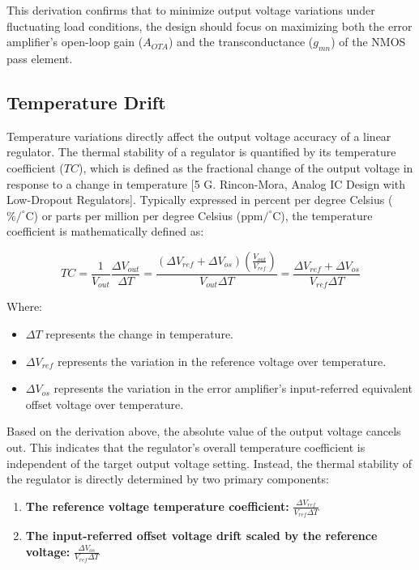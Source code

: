 \documentclass[
]{article}
\begin{document}
This derivation confirms that to minimize output voltage variations
under fluctuating load conditions, the design should focus on maximizing
both the error amplifier's open-loop gain (\(A_{OTA}\)) and the
transconductance (\(g_{mn}\)) of the NMOS pass element.

\subsection{Temperature Drift}\label{_temperature_drift}

Temperature variations directly affect the output voltage accuracy of a
linear regulator. The thermal stability of a regulator is quantified by
its temperature coefficient (\(TC\)), which is defined as the fractional
change of the output voltage in response to a change in temperature {[}5
G. Rincon-Mora, Analog IC Design with Low-Dropout Regulators{]}.
Typically expressed in percent per degree Celsius
(\(\%/^\circ\text{C}\)) or parts per million per degree Celsius
(\(\text{ppm}/^\circ\text{C}\)), the temperature coefficient is
mathematically defined as:

\[TC = \frac{1}{V_{out}} \frac{\Delta V_{out}}{\Delta T} = \frac{(\Delta V_{ref} + \Delta V_{os}) \left(\frac{V_{out}}{V_{ref}}\right)}{V_{out}\Delta T} = \frac{\Delta V_{ref} + \Delta V_{os}}{V_{ref}\Delta T}\]

Where:

\begin{itemize}
\item
  \(\Delta T\) represents the change in temperature.
\item
  \(\Delta V_{ref}\) represents the variation in the reference voltage
  over temperature.
\item
  \(\Delta V_{os}\) represents the variation in the error amplifier's
  input-referred equivalent offset voltage over temperature.
\end{itemize}

Based on the derivation above, the absolute value of the output voltage
cancels out. This indicates that the regulator's overall temperature
coefficient is independent of the target output voltage setting.
Instead, the thermal stability of the regulator is directly determined
by two primary components:

\begin{enumerate}
\def\labelenumi{\arabic{enumi}.}
\item
  \textbf{The reference voltage temperature coefficient:}
  \(\frac{\Delta V_{ref}}{V_{ref}\Delta T}\)
\item
  \textbf{The input-referred offset voltage drift scaled by the
  reference voltage:} \(\frac{\Delta V_{os}}{V_{ref}\Delta T}\)
\end{enumerate}
\end{document}
